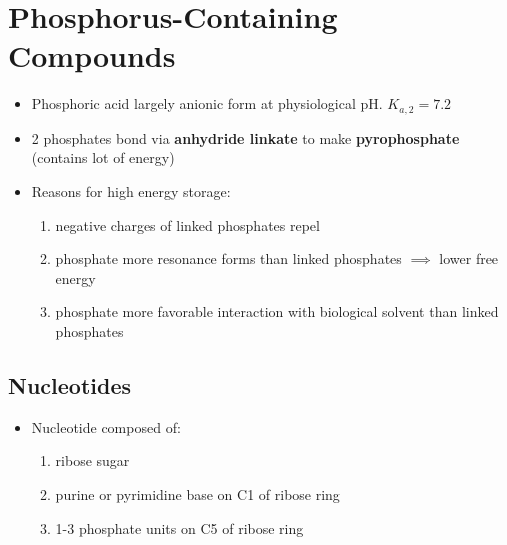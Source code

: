 \documentclass[10pt,a4paper]{report}
\begin{document}
	\section{Phosphorus-Containing Compounds}
	
	\begin{itemize}
		\item Phosphoric acid largely anionic form at physiological pH. $K_{a,2}=7.2$
		\item 2 phosphates bond via \textbf{anhydride linkate} to make \textbf{pyrophosphate} (contains lot of energy)
		\item Reasons for high energy storage:
		\begin{enumerate}
			\item negative charges of linked phosphates repel
			\item phosphate more resonance forms than linked phosphates $\implies$ lower free energy
			\item phosphate more favorable interaction with biological solvent than linked phosphates
		\end{enumerate}
	\end{itemize}
	
	\subsection{Nucleotides}
	
	\begin{itemize}
		\item Nucleotide composed of:
		\begin{enumerate}
			\item ribose sugar
			\item purine or pyrimidine base on C1 of ribose ring
			\item 1-3 phosphate units on C5 of ribose ring 
		\end{enumerate}
	\end{itemize}
\end{document}
